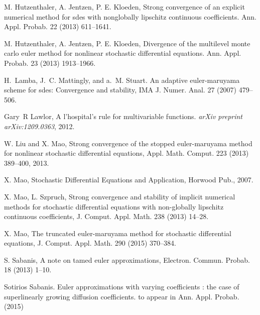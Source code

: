 \documentclass[sort&compress, preprint]{elsarticle}
\theoremstyle{definition}
\theoremstyle{plain}%
\theoremstyle{remark}
\begin{document}
\begin{thebibliography}{26}
M. Hutzenthaler, A. Jentzen,  P. E. Kloeden,
\newblock Strong convergence of an explicit numerical method for sdes with
  nonglobally lipschitz continuous coefficients.
\newblock Ann. Appl. Probab. 22 (2013) 611--1641.


M. Hutzenthaler, A. Jentzen,  P. E. Kloeden,
\newblock Divergence of the multilevel monte carlo euler method for nonlinear
  stochastic differential equations.
\newblock Ann. Appl. Probab. 23 (2013)  1913--1966.


H.~Lamba, J.~C. Mattingly, and a.~M. Stuart.
\newblock An adaptive euler-maruyama scheme for sdes: Convergence and
  stability,
\newblock IMA J. Numer. Anal. 27 (2007) 479--506.

Gary~R Lawlor,
\newblock A l'hospital's rule for multivariable functions.
\newblock \emph{arXiv preprint arXiv:1209.0363}, 2012.

W. Liu and X. Mao,
\newblock Strong convergence of the stopped euler-maruyama method for nonlinear
  stochastic differential equations,
\newblock Appl. Math. Comput. 223 (2013) 389--400,  2013.


X. Mao,
\newblock Stochastic Differential Equations and Application,
\newblock Horwood Pub., 2007.


X. Mao, L. Szpruch,
\newblock Strong convergence and stability of implicit numerical methods for
  stochastic differential equations with non-globally lipschitz continuous
  coefficients,
\newblock J. Comput. Appl. Math.
  238 (2013) 14--28.
  
X. Mao,
\newblock The truncated euler-maruyama method for stochastic differential
  equations,
\newblock J. Comput. Appl. Math. 290 (2015) 370--384.


S. Sabanis,
\newblock A note on tamed euler approximations,
\newblock Electron. Commun. Probab. 18 (2013) 1--10.

Sotirios Sabanis.
\newblock Euler approximations with varying coefficients : the case of
  superlinearly growing diffusion coefficients.
\newblock to appear in Ann. Appl. Probab. (2015)


\end{thebibliography}
\end{document}
